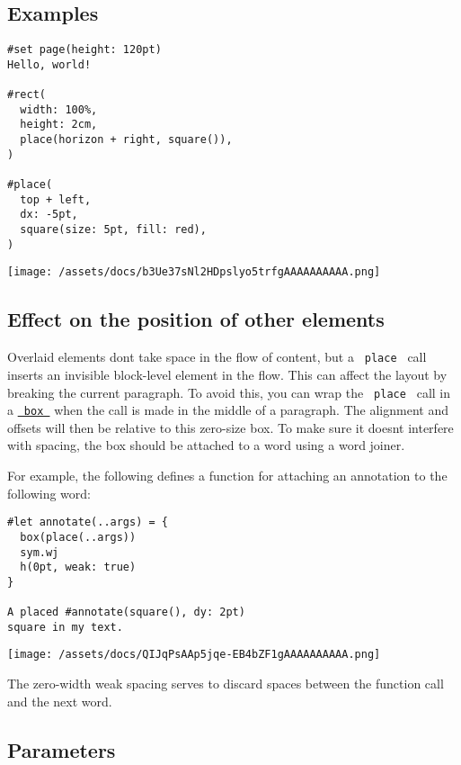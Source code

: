 \subsection{Examples}\label{examples}

\begin{verbatim}
#set page(height: 120pt)
Hello, world!

#rect(
  width: 100%,
  height: 2cm,
  place(horizon + right, square()),
)

#place(
  top + left,
  dx: -5pt,
  square(size: 5pt, fill: red),
)
\end{verbatim}

\texttt{[image: /assets/docs/b3Ue37sNl2HDpslyo5trfgAAAAAAAAAA.png]}

\subsection{Effect on the position of other
elements}\label{effect-on-other-elements}

Overlaid elements don\textquotesingle t take space in the flow of
content, but a \texttt{\ place\ } call inserts an invisible block-level
element in the flow. This can affect the layout by breaking the current
paragraph. To avoid this, you can wrap the \texttt{\ place\ } call in a
\href{/docs/reference/layout/box/}{\texttt{\ box\ }} when the call is
made in the middle of a paragraph. The alignment and offsets will then
be relative to this zero-size box. To make sure it
doesn\textquotesingle t interfere with spacing, the box should be
attached to a word using a word joiner.

For example, the following defines a function for attaching an
annotation to the following word:

\begin{verbatim}
#let annotate(..args) = {
  box(place(..args))
  sym.wj
  h(0pt, weak: true)
}

A placed #annotate(square(), dy: 2pt)
square in my text.
\end{verbatim}

\texttt{[image: /assets/docs/QIJqPsAAp5jqe-EB4bZF1gAAAAAAAAAA.png]}

The zero-width weak spacing serves to discard spaces between the
function call and the next word.

\subsection{\texorpdfstring{{ Parameters
}}{ Parameters }}\label{parameters}

